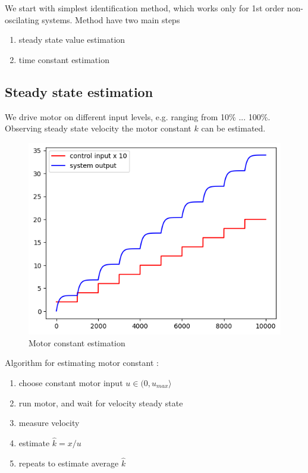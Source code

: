 \documentclass[12pt,twoside,onecolumn,openany,extrafontsizes,dvipsnames]{memoir}
\begin{document}
        We start with simplest identification method, which works only for 1st order non-oscilating systems.
        Method have two main steps
        \begin{enumerate}
            \item steady state value estimation
            \item time constant estimation
        \end{enumerate}

        \subsection{Steady state estimation}

            We drive motor on different input levels, e.g. ranging from 10\% ... 100\%. Observing steady 
            state velocity the motor constant $k$ can be estimated.

            \begin{figure}[!htb]
                \centering
                \includegraphics[scale=0.6]{../images/motor_control/motor_constant_estimation.png}
                \caption{Motor constant estimation}
                \label{fig:motor_constant_estimation}
            \end{figure}

            Algorithm for estimating motor constant :

            \begin{enumerate}
                \item choose constant motor input $u \in (0, u_{max} \rangle$
                \item run motor, and wait for velocity steady state
                \item measure velocity  
                \item estimate $\hat{k} = x/u$
                \item repeats to estimate average $\hat{k}$
            \end{enumerate}
\end{document}

